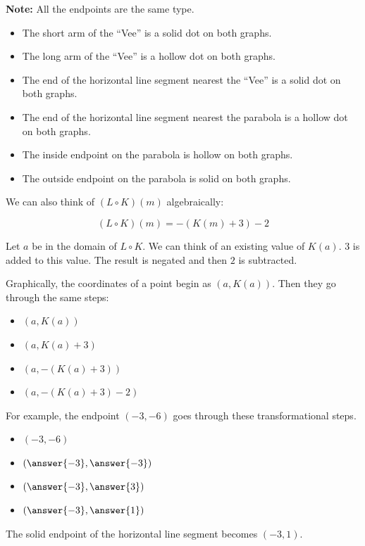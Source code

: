 \documentclass{ximera}
\begin{document}
\textbf{Note:} All the endpoints are the same type.  

\begin{itemize}
\item The short arm of the ``Vee'' is a solid dot on both graphs.
\item The long arm of the ``Vee'' is a hollow dot on both graphs.
\item The end of the horizontal line segment nearest the ``Vee'' is a solid dot on both graphs.
\item The end of the horizontal line segment nearest the parabola is a hollow dot on both graphs.
\item The inside endpoint on the parabola is hollow on both graphs.
\item The outside endpoint on the parabola is solid on both graphs.
\end{itemize}



We can also think of $(L \circ K)(m)$ algebraically:


\[
(L \circ K)(m) = -(K(m)+3) - 2
\]


Let $a$ be in the domain of $L \circ K$. We can think of an existing value of $K(a)$.  $3$ is added to this value. The result is negated and then $2$ is subtracted. 

Graphically, the coordinates of a point begin as $(a, K(a))$.  Then they go through the same steps: 


\begin{itemize}
\item $(a, K(a))$
\item $(a, K(a) + 3)$
\item $(a, -(K(a) + 3))$
\item $(a, -(K(a) + 3) - 2)$
\end{itemize}



\begin{procedure}
For example, the endpoint $(-3, -6)$ goes through these transformational steps.

\begin{itemize}
\item $(-3, -6)$
\item $\left( \answer{-3},  \answer{-3} \right)$
\item $\left( \answer{-3},  \answer{3} \right)$
\item $\left( \answer{-3},  \answer{1} \right)$
\end{itemize}

The solid endpoint of the horizontal line segment becomes $(-3, 1)$.
\end{procedure}
\end{document}

